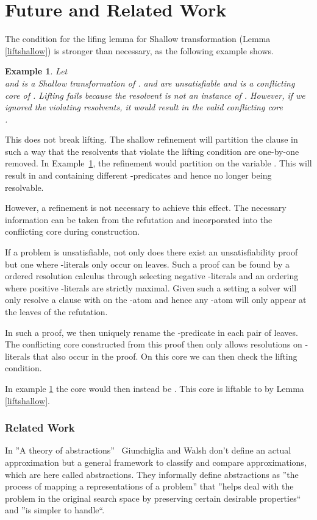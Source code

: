 \documentclass{llncs}
\newtheorem{exmp}{Example}
\begin{document}
\section{Future and Related Work} \label{sec:furewo}


The condition for the lifing lemma for Shallow transformation (Lemma \ref{liftshallow})  is stronger than necessary, as the following example shows.  

\begin{exmp}\label{shallowex2}
Let   \\    and
   is a Shallow transformation of . 
 and  are unsatisfiable and   
is a conflicting core of . Lifting  fails because the resolvent  is not an instance of  .
However, if we ignored the violating resolvents, it would result in the valid conflicting core  \\ .
\end{exmp} 

This does not break lifting. 
The shallow refinement will partition the clause in such a way that the resolvents that violate the lifting condition are one-by-one removed.
In Example~\ref{shallowex2}, the refinement would partition   on the variable .
This will result in   and   containing different -predicates and hence no longer being resolvable. 

However, a refinement is not necessary to achieve this effect. 
The necessary information can be taken from the refutation 
and incorporated into the conflicting core during construction.

If a problem  is unsatisfiable, not only does there exist an unsatisfiability proof but one where -literals only occur on leaves.
Such a proof can be found by a ordered resolution calculus through selecting negative -literals and an ordering where positive -literals are strictly maximal.
Given such a setting a solver will only resolve a clause  
 with  on the -atom 
and hence any -atom will only appear at the leaves of the refutation.

In such a proof, we then uniquely rename the -predicate in each pair of leaves.
The conflicting core constructed from this proof then only allows resolutions on -literals that also occur in the proof. 
On this core we can then check the lifting condition.

In example \ref{shallowex2} the core would then instead be 
    .
This core is liftable to  by Lemma \ref{liftshallow}.
 

\subsubsection{Related Work}
In ''A theory of abstractions''~\cite{Giunchiglia:1992:TA:146945.146951}  Giunchiglia and Walsh don't define an actual approximation but a general framework to classify and compare approximations, which are here called abstractions. 
They informally define abstractions as ''the process of mapping a representations of a problem'' that ''helps deal with the problem in the original search space by preserving certain desirable properties`` and ''is simpler to handle``. 
\end{document}
